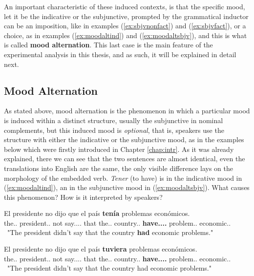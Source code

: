 An important characteristic of these induced contexts, is that the specific mood, let it be the indicative or the subjunctive, prompted by the grammatical inductor can be an imposition, like in examples (\ref{ex:sbjvnonfact}) and (\ref{ex:sbjvfact}), or a choice, as in examples (\ref{ex:moodaltind}) and (\ref{ex:moodaltsbjv}), and this is what is called \textbf{mood alternation}. This last case is the main feature of the experimental analysis in this thesis, and as such, it will be explained in detail next.\\ 

\subsection{Mood Alternation}
\label{subsect:moodalt}

As stated above, mood alternation is the phenomenon in which a particular mood is induced within a distinct structure, usually the subjunctive in nominal complements, but this induced mood is \textit{optional}, that is, speakers use the structure with either the indicative or the subjunctive mood, as in the examples below which were firstly introduced in Chapter \ref{chap:intr}. As it was already explained, there we can see that the two sentences are almost identical, even the translations into English are the same, the only visible difference lays on the morphology of the embedded verb. \textit{Tener} (to have) is in the indicative mood in (\ref{ex:moodaltind}), an in the subjunctive mood in (\ref{ex:moodaltsbjv}). What causes this phenomenon? How is it interpreted by speakers?\\

\begin{exe}
  \ex
    \begin{xlist}
      \item  {\gll El presidente no dijo que el país \textbf{tenía} problemas económicos.\\ the.\M.\Sg{} president.\M.\Sg{} not say.\Pst.\Pfv.\Ind.\Tsg{} that the.\M.\Sg{} country.\M.\Sg{} \textbf{have.\Pst.\Ipfv.\Ind.\Tsg{}} problem.\M.\Pl{} economic.\M.\Pl{} \\\ "The president didn't say that the country \textbf{had} economic problems."\glt }\label{ex:moodaltind}
      \item {\gll El presidente no dijo que el país \textbf{tuviera} problemas económicos.\\   the.\M.\Sg{} president.\M.\Sg{} not say.\Pst.\Pfv.\Ind.\Tsg{} that the.\M.\Sg{} country.\M.\Sg{} \textbf{have.\Pst.\Ipfv.\Sbjv.\Tsg{}} problem.\M.\Pl{} economic.\M.\Pl{} \\\ "The president didn't say that the country had economic problems."\glt }\label{ex:moodaltsbjv}
    \end{xlist}
\end{exe}

